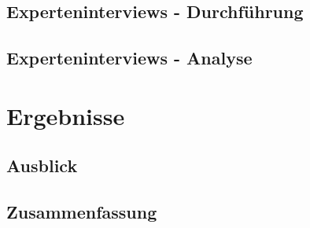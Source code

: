 \documentclass[draft,final]{vutinfth} %
\begin{document}
\section{Experteninterviews - Durchführung}

\section{Experteninterviews - Analyse}



\chapter{Ergebnisse}

\section{Ausblick}

\section{Zusammenfassung}



\backmatter

\listoffigures %

\cleardoublepage %
\listoftables %

\listofalgorithms
{}

\printindex

\printglossaries



\end{document}
